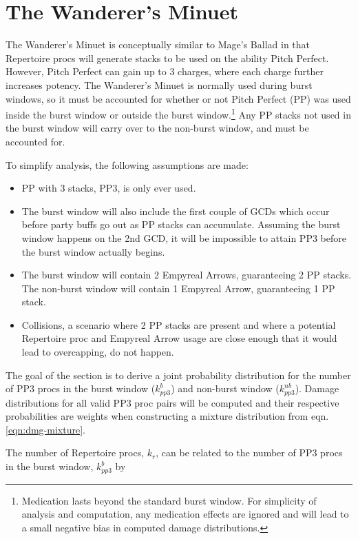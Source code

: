 \section{The Wanderer's Minuet}

The Wanderer's Minuet is conceptually similar to Mage's Ballad in that Repertoire procs will generate stacks to be used on the ability Pitch Perfect. However, Pitch Perfect can gain up to 3 charges, where each charge further increases potency. The Wanderer's Minuet is normally used during burst windows, so it must be accounted for whether or not Pitch Perfect (PP) was used inside the burst window or outside the burst window.\footnote{Medication lasts beyond the standard burst window. For simplicity of analysis and computation, any medication effects are ignored and will lead to a small negative bias in computed damage distributions.}  Any PP stacks not used in the burst window will carry over to the non-burst window, and must be accounted for.

To simplify analysis, the following assumptions are made:

\begin{itemize}
    \item PP with 3 stacks, PP3, is only ever used.
    \item The burst window will also include the first couple of GCDs which occur before party buffs go out as PP stacks can accumulate. Assuming the burst window happens on the 2nd GCD, it will be impossible to attain PP3 before the burst window actually begins.
    \item  The burst window will contain 2 Empyreal Arrows, guaranteeing 2 PP stacks. The non-burst window will contain 1 Empyreal Arrow, guaranteeing 1 PP stack. 
    \item Collisions, a scenario where 2 PP stacks are present and where a potential Repertoire proc and Empyreal Arrow usage are close enough that it would lead to overcapping, do not happen. 
\end{itemize}

The goal of the section is to derive a joint probability distribution for the number of PP3 procs in the burst window ($k^b_{pp3}$) and non-burst window ($k_{pp3}^{nb}$). Damage distributions for all valid PP3 proc pairs will be computed and their respective probabilities are weights when constructing a mixture distribution from eqn. \ref{eqn:dmg-mixture}.

The number of Repertoire procs, $k_r$, can be related to the number of PP3 procs in the burst window, $k^b_{pp3}$ by

